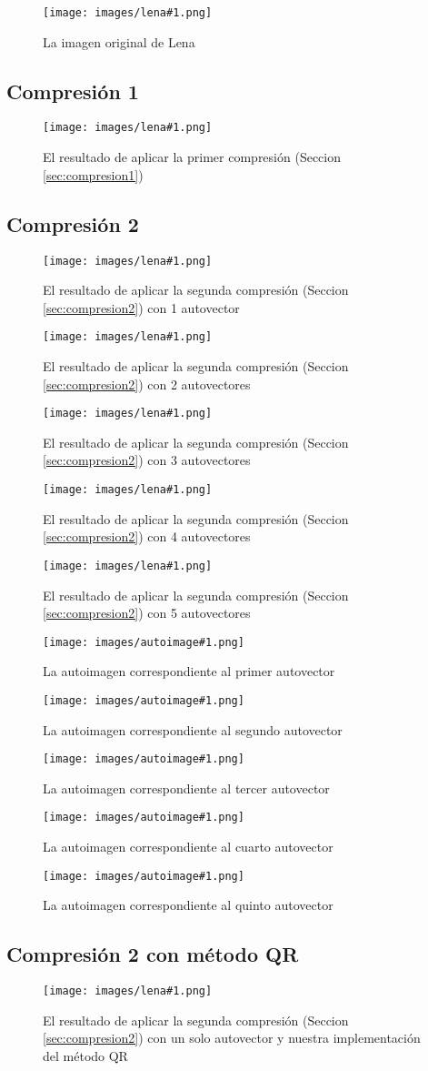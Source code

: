 \documentclass[twocolumn,a4paper,10pt]{article}
\begin{document}
\newcommand{\lena}[2]{
    \begin{figure}[H]
        \texttt{[image: images/lena\#1.png]}
        \caption{#2}
        \label{fig:lena#1}
    \end{figure}
}

\newcommand{\autoimage}[2]{
    \begin{figure}[H]
        \texttt{[image: images/autoimage\#1.png]}
        \caption{#2}
        \label{fig:lena#1}
    \end{figure}
}

\lena{512}{La imagen original de Lena}

\subsection{Compresi\'on 1}

\lena{-bruta}{El resultado de aplicar la primer compresi\'on (Seccion \ref{sec:compresion1})}

\subsection{Compresi\'on 2}

\lena{-eig-1}{El resultado de aplicar la segunda compresi\'on (Seccion \ref{sec:compresion2}) con 1 autovector}
\lena{-eig-2}{El resultado de aplicar la segunda compresi\'on (Seccion \ref{sec:compresion2}) con 2 autovectores}
\lena{-eig-3}{El resultado de aplicar la segunda compresi\'on (Seccion \ref{sec:compresion2}) con 3 autovectores}
\lena{-eig-4}{El resultado de aplicar la segunda compresi\'on (Seccion \ref{sec:compresion2}) con 4 autovectores}
\lena{-eig-5}{El resultado de aplicar la segunda compresi\'on (Seccion \ref{sec:compresion2}) con 5 autovectores}

\autoimage{1}{La autoimagen correspondiente al primer autovector}
\autoimage{2}{La autoimagen correspondiente al segundo autovector}
\autoimage{3}{La autoimagen correspondiente al tercer autovector}
\autoimage{4}{La autoimagen correspondiente al cuarto autovector}
\autoimage{5}{La autoimagen correspondiente al quinto autovector}

\subsection{Compresi\'on 2 con m\'etodo QR}

\lena{-qr-1}{El resultado de aplicar la segunda compresi\'on (Seccion \ref{sec:compresion2}) con un solo autovector y nuestra implementaci\'on del m\'etodo QR}
\end{document}

